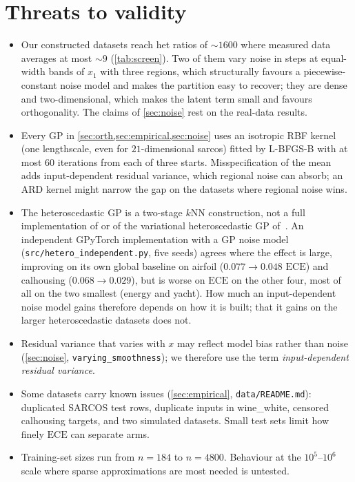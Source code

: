 \documentclass[11pt]{article}
\newcommand{\ece}{\mathrm{ECE}}
\begin{document}
\section{Threats to validity}
\label{sec:threats}
\begin{itemize}
\item Our constructed datasets reach het ratios of ${\sim}1600$ where measured data
averages at most ${\sim}9$ (\cref{tab:screen}). Two of them vary noise in steps at
equal-width bands of $x_1$ with three regions, which structurally favours a
piecewise-constant noise model and makes the partition easy to recover; they are dense
and two-dimensional, which makes the latent term small and favours orthogonality. The
claims of \cref{sec:noise} rest on the real-data results.
\item Every GP in \cref{sec:orth,sec:empirical,sec:noise} uses an isotropic RBF kernel
(one lengthscale, even for $21$-dimensional sarcos) fitted by L-BFGS-B with at most
$60$ iterations from each of three starts. Misspecification of the mean adds
input-dependent residual variance, which regional noise can absorb; an ARD kernel
might narrow the gap on the datasets where regional noise wins.
\item The heteroscedastic GP is a two-stage $k$NN construction, not a full
implementation of \citet{kersting2007} or of the variational heteroscedastic GP
of~\citet{lazarogredilla2011}. An independent GPyTorch implementation with a GP noise
model (\texttt{src/hetero\_independent.py}, five seeds) agrees where the effect is
large, improving on its own global baseline on airfoil ($0.077 \to 0.048$ $\ece$) and
calhousing ($0.068 \to 0.029$), but is worse on $\ece$ on the other four, most of all
on the two smallest (energy and yacht). How much an input-dependent noise model gains therefore
depends on how it is built; that it gains on the larger heteroscedastic datasets does
not.
\item Residual variance that varies with $x$ may reflect model bias rather than noise
(\cref{sec:noise}, \texttt{varying\_smoothness}); we therefore use the term
\emph{input-dependent residual variance}.
\item Some datasets carry known issues (\cref{sec:empirical}, \texttt{data/README.md}):
duplicated SARCOS test rows, duplicate inputs in wine\_white, censored calhousing
targets, and two simulated datasets. Small test sets limit how finely $\ece$ can
separate arms.
\item Training-set sizes run from $n=184$ to $n=4800$. Behaviour at the $10^5$--$10^6$
scale where sparse approximations are most needed is untested.
\end{itemize}
\end{document}

